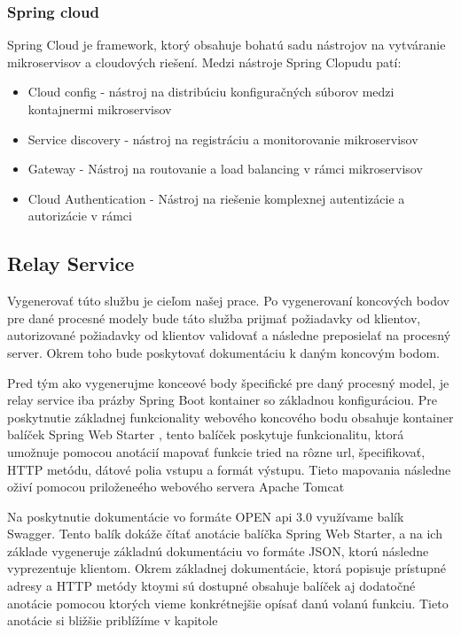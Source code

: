   

\subsubsection{Spring cloud} 

 Spring Cloud je framework, ktorý obsahuje bohatú sadu nástrojov na vytváranie mikroservisov a cloudových riešení. Medzi nástroje Spring Clopudu patí:  

\begin{itemize} 

\item Cloud config - nástroj na distribúciu konfiguračných súborov medzi kontajnermi mikroservisov

\item Service discovery - nástroj na registráciu a monitorovanie mikroservisov 

\item Gateway - Nástroj na routovanie a load balancing v rámci mikroservisov 

\item Cloud Authentication - Nástroj na riešenie komplexnej autentizácie a autorizácie v rámci 

\end{itemize} 


\subsection{Relay Service}
Vygenerovať túto službu je cieľom našej prace. Po vygenerovaní koncových bodov pre dané procesné modely bude táto služba prijmať požiadavky od klientov, autorizované požiadavky od klientov validovať a následne preposielať na procesný server. Okrem toho bude poskytovať dokumentáciu k daným koncovým bodom.

Pred tým ako vygenerujme konceové body špecifické pre daný procesný model, je relay service iba prázby Spring Boot kontainer so základnou konfiguráciou. Pre poskytnutie základnej funkcionality webového koncového bodu obsahuje kontainer balíček Spring Web Starter \cite{webstarter}, tento balíček poskytuje funkcionalitu, ktorá umožnuje pomocou anotácií mapovať funkcie tried na rôzne \acrshort{url}, špecifikovať, HTTP metódu, dátové polia vstupu a formát výstupu. Tieto mapovania následne oživí pomocou priloženeého webového servera Apache Tomcat \cite{tomcat}


Na poskytnutie dokumentácie vo formáte OPEN api 3.0 využívame balík Swagger. Tento balík dokáže čítať anotácie balíčka Spring Web Starter, a na ich základe vygeneruje základnú dokumentáciu vo formáte JSON, ktorú následne vyprezentuje klientom. Okrem základnej dokumentácie, ktorá popisuje prístupné adresy a HTTP metódy ktoymi sú dostupné obsahuje balíček aj dodatočné anotácie pomocou ktorých vieme konkrétnejšie opísať danú volanú funkciu. Tieto anotácie si bližšie priblížíme v kapitole 


